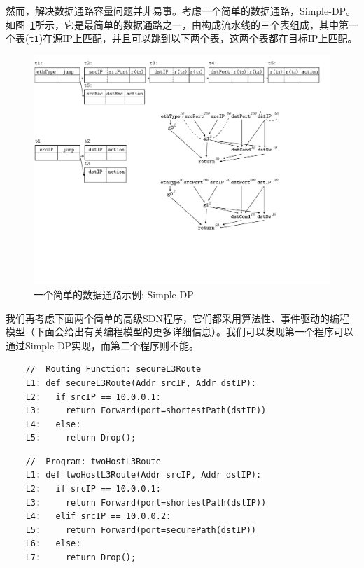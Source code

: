 然而，解决数据通路容量问题并非易事。考虑一个简单的数据通路，Simple-DP。如图~\ref{cap:fig:fig1-update}所示，它是最简单的数据通路之一，由构成流水线的三个表组成，其中第一个表(\texttt{t1})在源IP上匹配，并且可以跳到以下两个表，这两个表都在目标IP上匹配。

\begin{figure}[h!]
    \centering
    \vspace{-0.1in}
    \includegraphics[scale = 0.7]{figures/figure1.pdf}
    \vspace{-0.1in}
    \caption{一个简单的数据通路示例: Simple-DP}
    \vspace{-0.1in}
    \label{cap:fig:fig1-update}
\end{figure}

我们再考虑下面两个简单的高级SDN程序，它们都采用算法性、事件驱动的编程模型（下面会给出有关编程模型的更多详细信息）。我们可以发现第一个程序可以通过Simple-DP实现，而第二个程序则不能。

{\small
    \begin{verbatim}
    //  Routing Function: secureL3Route
    L1: def secureL3Route(Addr srcIP, Addr dstIP):
    L2:   if srcIP == 10.0.0.1:
    L3:     return Forward(port=shortestPath(dstIP))
    L4:   else:
    L5:     return Drop();
    \end{verbatim}
}

{\small
    \begin{verbatim}
    //  Program: twoHostL3Route
    L1: def twoHostL3Route(Addr srcIP, Addr dstIP):
    L2:   if srcIP == 10.0.0.1:
    L3:     return Forward(port=shortestPath(dstIP)) 
    L4:   elif srcIP == 10.0.0.2:
    L5:     return Forward(port=securePath(dstIP))
    L6:   else:
    L7:     return Drop();
    \end{verbatim}
}

